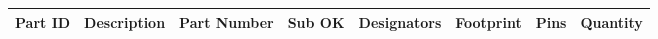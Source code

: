 \documentclass{article}
\begin{document}


\begin{center}
    \begin{longtable}{| r | p{4.7cm} | p{3.8cm} | l | p{3.8cm} | l | r | r |}
    \hline
	\multicolumn{1}{|l|}{\textbf{Part ID}} & \multicolumn{1}{l|}{\textbf{Description}} & \multicolumn{1}{l|}{\textbf{Part Number}} & \multicolumn{1}{l|}{\textbf{Sub OK}} & \multicolumn{1}{l|}{\textbf{Designators}} & \multicolumn{1}{l|}{\textbf{Footprint}} & \multicolumn{1}{r|}{\textbf{Pins}} & \multicolumn{1}{r|}{\textbf{Quantity}} \\ \hline	 
	\endhead
	
    \end{longtable}
\end{center}

\end{document}
